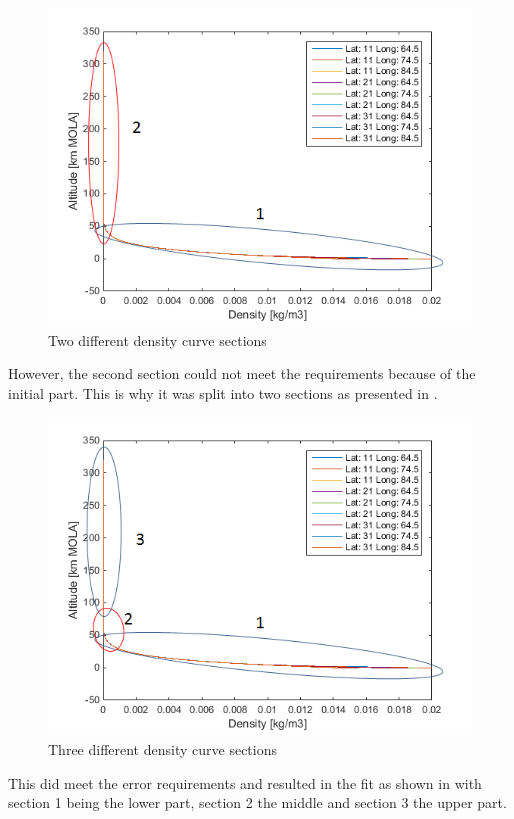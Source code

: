 \begin{figure}[H]
\centering
\includegraphics[width=0.7 \textwidth]{figures/software/densityDataSplit2.png}
\caption{Two different density curve sections}
\label{fig:densityDataSplit2}
\end{figure}

However, the second section could not meet the requirements because of the initial part. This is why it was split into two sections as presented in .

\begin{figure}[H]
\centering
\includegraphics[width=0.8 \textwidth]{figures/software/densityDataSplit3.png}
\caption{Three different density curve sections}
\label{fig:densityDataSplit3}
\end{figure}

This did meet the error requirements and resulted in the fit as shown in  with section 1 being the lower part, section 2 the middle and section 3 the upper part.

